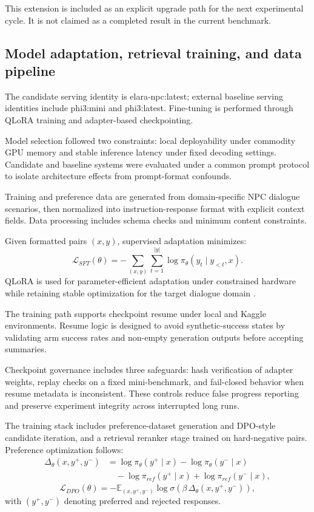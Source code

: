 ﻿\documentclass[a4paper,12pt]{article}
\begin{document}
This extension is included as an explicit upgrade path for the next experimental cycle. It is not claimed as a completed result in the current benchmark.

\subsection{Model adaptation, retrieval training, and data pipeline}

The candidate serving identity is elara-npc:latest; external baseline serving identities include phi3:mini and phi3:latest. Fine-tuning is performed through QLoRA training and adapter-based checkpointing.

Model selection followed two constraints: local deployability under commodity GPU memory and stable inference latency under fixed decoding settings. Candidate and baseline systems were evaluated under a common prompt protocol to isolate architecture effects from prompt-format confounds.

Training and preference data are generated from domain-specific NPC dialogue scenarios, then normalized into instruction-response format with explicit context fields. Data processing includes schema checks and minimum content constraints.

Given formatted pairs \((x,y)\), supervised adaptation minimizes:
\begin{equation}
\mathcal{L}_{SFT}(\theta) = -\sum_{(x,y)}\sum_{t=1}^{|y|}\log \pi_\theta(y_t\mid y_{<t},x).
\end{equation}
QLoRA is used for parameter-efficient adaptation under constrained hardware while retaining stable optimization for the target dialogue domain \cite{Dettmers2023QLoRA}.

The training path supports checkpoint resume under local and Kaggle environments. Resume logic is designed to avoid synthetic-success states by validating arm success rates and non-empty generation outputs before accepting summaries.

Checkpoint governance includes three safeguards: hash verification of adapter weights, replay checks on a fixed mini-benchmark, and fail-closed behavior when resume metadata is inconsistent. These controls reduce false progress reporting and preserve experiment integrity across interrupted long runs.

The training stack includes preference-dataset generation and DPO-style candidate iteration, and a retrieval reranker stage trained on hard-negative pairs. Preference optimization follows:
\begin{equation}
\begin{aligned}
\Delta_\theta(x,y^+,y^-)
&= \log \pi_\theta(y^+\mid x)-\log \pi_\theta(y^-\mid x) \\
&\quad -\log \pi_{ref}(y^+\mid x)+\log \pi_{ref}(y^-\mid x),
\end{aligned}
\end{equation}
\begin{equation}
\mathcal{L}_{DPO}(\theta)=
-\mathbb{E}_{(x,y^+,y^-)}\log \sigma\!\left(\beta\,\Delta_\theta(x,y^+,y^-)\right),
\end{equation}
with \((y^+,y^-)\) denoting preferred and rejected responses.
\end{document}
